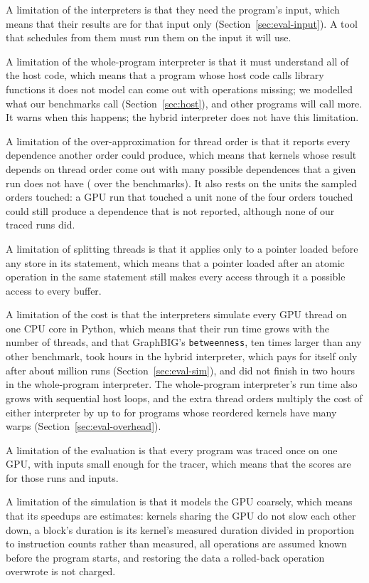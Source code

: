 \documentclass[11pt]{article}
\newcommand{\secref}[1]{Section~\ref{#1}}
\newcommand{\code}[1]{\texttt{#1}}
\begin{document}
A limitation of the interpreters is that they need the program's input, which means that their results are for
that input only (\secref{sec:eval-input}). A tool that schedules from them must run them on the input it will use.

A limitation of the whole-program interpreter is that it must understand all of the host code, which means that a
program whose host code calls library functions it does not model can come out with operations missing; we modelled
what our benchmarks call (\secref{sec:host}), and other programs will call more. It warns when this happens; the
hybrid interpreter does not have this limitation.

A limitation of the over-approximation for thread order is that it reports every dependence another order could
produce, which means that kernels whose result depends on thread order come out with many possible dependences that a
given run does not have (\numBenchHyPossNo{} over the benchmarks). It also rests on the units the sampled orders
touched: a GPU run that touched a unit none of the four orders touched could still produce a dependence that is not
reported, although none of our traced runs did.

A limitation of splitting threads is that it applies only to a pointer loaded before any store in its statement,
which means that a pointer loaded after an atomic operation in the same statement still makes every access through
it a possible access to every buffer.

A limitation of the cost is that the interpreters simulate every GPU thread on one CPU core in Python, which means
that their run time grows with the number of threads, and that GraphBIG's \code{betweenness}, ten times larger than
any other benchmark, took \numBenchHyAloneHours{} hours in the hybrid interpreter, which pays for itself only after about
\numBtwBreakEven{} million runs (\secref{sec:eval-sim}), and did not finish in two hours in the whole-program
interpreter. The whole-program interpreter's run time also grows with
sequential host loops, and the extra thread orders
multiply the cost of either interpreter by up to \numHyOrdersHi{} for programs whose reordered kernels have many
warps (\secref{sec:eval-overhead}).

A limitation of the evaluation is that every program was traced once on one GPU, with inputs small enough for the
tracer, which means that the scores are for those runs and inputs.

A limitation of the simulation is that it models the GPU coarsely, which means that its speedups are estimates:
kernels sharing the GPU do not slow each other down, a block's duration is its kernel's measured duration divided
in proportion to instruction counts rather than measured, all operations are assumed known before the program
starts, and restoring the data a rolled-back operation overwrote is not charged.
\end{document}
